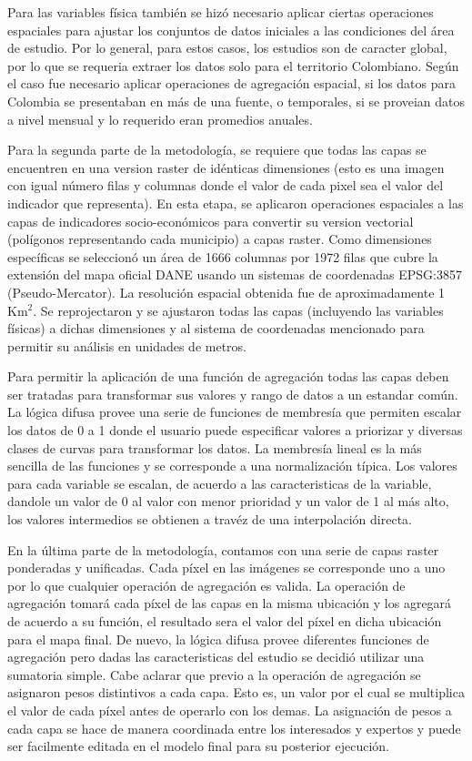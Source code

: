 Para las variables física también se hizó necesario aplicar ciertas operaciones espaciales para ajustar los conjuntos de datos iniciales a las condiciones del 
área de estudio.  Por lo general, para estos casos, los estudios son de caracter global, por lo que se requeria extraer los datos solo para el territorio 
Colombiano.  Según el caso fue necesario aplicar operaciones de agregación espacial, si los datos para Colombia se presentaban en más de una fuente, o 
temporales, si se proveian datos a nivel mensual y lo requerido eran promedios anuales.  

Para la segunda parte de la metodología, se requiere que todas las capas se encuentren en una version raster de idénticas dimensiones (esto es 
una imagen con igual número filas y columnas donde el valor de cada pixel sea el valor del indicador que representa).  En esta etapa, se aplicaron operaciones 
espaciales a las capas de indicadores socio-económicos para convertir su version vectorial (polígonos representando cada municipio) a capas raster.  Como 
dimensiones específicas se seleccionó un área de 1666 columnas por 1972 filas que cubre la extensión del mapa oficial DANE usando un sistemas de coordenadas 
EPSG:3857 (Pseudo-Mercator).  La resolución espacial obtenida fue de aproximadamente 1 Km$^2$.  Se reprojectaron y se ajustaron todas las capas (incluyendo las 
variables físicas) a dichas dimensiones y al sistema de coordenadas mencionado para permitir su análisis en unidades de metros.

Para permitir la aplicación de una función de agregación todas las capas deben ser tratadas para transformar sus valores y rango de datos a un estandar común.  
La lógica difusa provee una serie de funciones de membresía que permiten escalar los datos de 0 a 1 donde el usuario puede especificar valores a priorizar y 
diversas clases de curvas para transformar los datos.  La membresía lineal es la más sencilla de las funciones y se corresponde a una normalización típica.  
Los valores para cada variable se escalan, de acuerdo a las caracteristicas de la variable, dandole un valor de 0 al valor con menor prioridad y un valor de 
1 al más alto, los valores intermedios se obtienen a travéz de una interpolación directa.  

En la última parte de la metodología, contamos con una serie de capas raster ponderadas y unificadas.  Cada píxel en las imágenes se corresponde uno a uno por 
lo que cualquier operación de agregación es valida.  La operación de agregación tomará cada píxel de las capas en la misma ubicación y los agregará de acuerdo 
a su función, el resultado sera el valor del píxel en dicha ubicación para el mapa final.  De nuevo, la lógica difusa provee diferentes funciones de agregación 
pero dadas las caracteristicas del estudio se decidió utilizar una sumatoria simple.  Cabe aclarar que previo a la operación de agregación se asignaron pesos 
distintivos a cada capa.  Esto es, un valor por el cual se multiplica el valor de cada píxel antes de operarlo con los demas.  La asignación de pesos a cada 
capa se hace de manera coordinada entre los interesados y expertos y puede ser facilmente editada en el modelo final para su posterior ejecución.  


